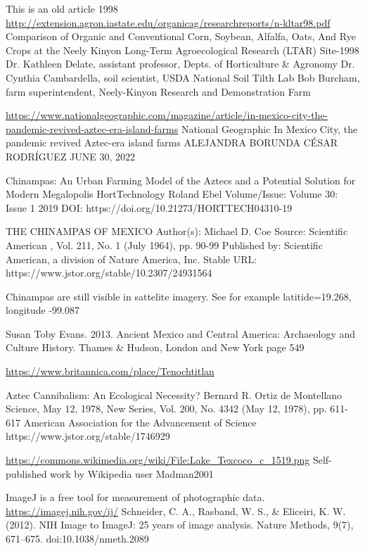 \documentclass[12pt]{iopart}
\begin{document}
\begin{thebibliography}{99}
This is an old article 
1998
\url{http://extension.agron.iastate.edu/organicag/researchreports/n-kltar98.pdf}
Comparison of Organic and Conventional Corn, 
Soybean, Alfalfa, Oats, And Rye Crops at the Neely Kinyon Long-Term Agroecological Research (LTAR) 
Site-1998 
Dr. Kathleen Delate, assistant professor, Depts. of Horticulture \& Agronomy 
Dr. Cynthia Cambardella, soil scientist, USDA National Soil Tilth Lab 
Bob Burcham, farm superintendent, Neely-Kinyon Research and Demonstration Farm

\url{https://www.nationalgeographic.com/magazine/article/in-mexico-city-the-pandemic-revived-aztec-era-island-farms}
National Geographic
In Mexico City, the pandemic revived Aztec-era island farms
ALEJANDRA BORUNDA
CÉSAR RODRÍGUEZ
JUNE 30, 2022

Chinampas: An Urban Farming Model of the Aztecs and a Potential Solution for Modern Megalopolis
HortTechnology
Roland Ebel
Volume/Issue: Volume 30: Issue 1
2019
DOI: https://doi.org/10.21273/HORTTECH04310-19

THE CHINAMPAS OF MEXICO
Author(s): Michael D. Coe
Source: Scientific American , Vol. 211, No. 1 (July 1964), pp. 90-99
Published by: Scientific American, a division of Nature America, Inc.
Stable URL: https://www.jstor.org/stable/10.2307/24931564

Chinampas are still visible in sattelite imagery.  See for example latitide=19.268, longitude -99.087

Susan Toby Evans. 
2013. 
Ancient Mexico and Central America: Archaeology and Culture History. 
Thames \& Hudson, London and New York
page 549

\url{https://www.britannica.com/place/Tenochtitlan}

Aztec Cannibalism: An Ecological Necessity?
Bernard R. Ortiz de Montellano
Science, May 12, 1978, New Series, Vol. 200, No. 4342 (May 12, 1978), pp. 611-617
American Association for the Advancement of Science
https://www.jstor.org/stable/1746929

\url{https://commons.wikimedia.org/wiki/File:Lake\_Texcoco\_c\_1519.png}
Self-published work by Wikipedia user Madman2001


ImageJ is a free tool for measurement of photographic data.  
\url{https://imagej.nih.gov/ij/}
Schneider, C. A., Rasband, W. S., \& Eliceiri, K. W. (2012). NIH Image to ImageJ: 25 years of image analysis. Nature Methods, 9(7), 671–675. doi:10.1038/nmeth.2089
\end{thebibliography}
\end{document}
